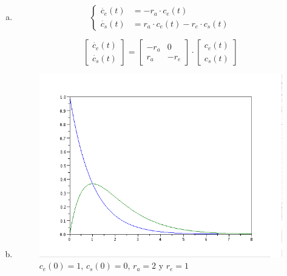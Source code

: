 \documentclass{article}
\begin{document}
\begin{itemize}
        \begin{enumerate}[a)]
\item
\begin{equation}
\left\{ \begin{array}{rl}
  \dot{c_{e}}(t) &= -r_{a} \cdot c_{e}(t) \\
  \dot{c_{s}}(t) &= r_{a} \cdot c_{e}(t) - r_{e} \cdot c_{s}(t)
       \end{array} \right .
 \label{P1.1a} \tag{1.5}
\end{equation}

\begin{equation*}
\begin{bmatrix}
   \dot{c_{e}}(t) \\
   \dot{c_{s}}(t) 
 \end{bmatrix}
=
\begin{bmatrix}
   - r_{a} & 0 \\
     r_{a} & -r_{e}
\end{bmatrix} 
\cdot 
\begin{bmatrix}
   c_{e}(t) \\
   c_{s}(t) 
\end{bmatrix}
\end{equation*}

\item
\begin{figure}[H]
\includegraphics[width=\textwidth]{img/ej02-b.png}
\caption{$c_{e}(0)=1$, $c_{s}(0)=0$, $r_{a}=2$ y $r_{e}=1$ }
\end{figure}


\end{enumerate}
\end{itemize}
\end{document}
